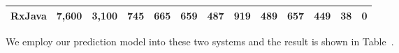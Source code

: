 \begin{table*}[tbh]
\begin{tabular}{|c|r|r|c|r|c|r|c|r|c|r|c|r|}
		RxJava            & 7,600                                                                           & 3,100                                                                  & \multicolumn{1}{r|}{745}                                & 665                                                                           & \multicolumn{1}{r|}{659}                                & 487                                                                           & \multicolumn{1}{r|}{919}                                & 489                                                                           & \multicolumn{1}{r|}{657}                                & 449                                                                           & \multicolumn{1}{r|}{38}                                 & 0                                                                             \\ \hline
	\end{tabular}
\end{table*}

We employ our prediction model into these two systems and the result is shown in Table~{}.

